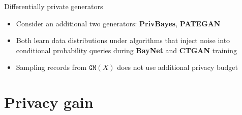 \documentclass[xcolor=dvipsnames,compress]{beamer}
\begin{document}
\begin{frame}{Differentially private generators}
   \vspace{1cm}
   \begin{itemize}
   	\setlength\itemsep{3em}
   	\item Consider an additional two generators: \textbf{PrivBayes}, \textbf{PATEGAN}~\cite{PATEGAN}
   	\item Both learn data distributions under algorithms that inject noise into conditional probability queries during \textbf{BayNet} and \textbf{CTGAN} training
   	\item Sampling records from \(\texttt{GM}(X)\) does not use additional privacy budget
   \end{itemize}
\end{frame}

\section{Privacy gain}
\end{document}
